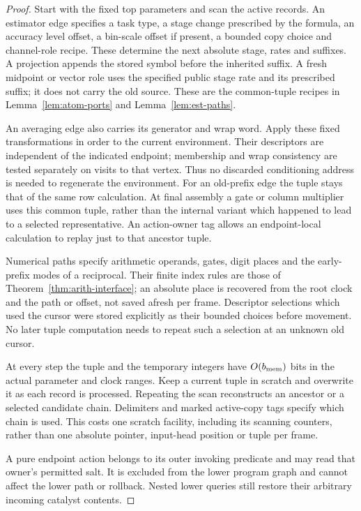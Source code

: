 \documentclass[11pt]{article}
\numberwithin{equation}{section}
\theoremstyle{definition}
\theoremstyle{remark}
\begin{document}
\begin{proof}
Start with the fixed top parameters and scan the active records.  An
estimator edge specifies a task type, a stage change prescribed by the
formula, an accuracy level offset, a bin-scale offset if present, a bounded copy
choice and channel-role recipe.  These determine the next absolute
stage, rates and suffixes.  A projection appends the stored symbol
before the inherited suffix.  A fresh midpoint or vector role uses the
specified public stage rate and its prescribed suffix; it does not
carry the old source.  These are the common-tuple recipes in
Lemma~\ref{lem:atom-ports} and Lemma~\ref{lem:est-paths}.

An averaging edge also carries its generator and wrap word.  Apply
these fixed transformations in order to the current environment.  Their
descriptors are independent of the indicated endpoint; membership and
wrap consistency are tested separately on visits to that vertex.
Thus no discarded conditioning address is needed to regenerate the
environment.  For an old-prefix edge the tuple stays that of the same
row calculation.  At final assembly a gate or column multiplier uses
this common tuple, rather than the internal variant which happened to
lead to a selected representative.  An action-owner tag allows an
endpoint-local calculation to replay just to that ancestor tuple.

Numerical paths specify arithmetic operands, gates, digit places and
the early-prefix modes of a reciprocal.  Their finite index rules are
those of Theorem~\ref{thm:arith-interface}; an absolute place is recovered
from the root clock and the path or offset, not saved afresh per frame.
Descriptor selections which used the cursor were stored explicitly as
their bounded choices before movement.  No later tuple computation
needs to repeat such a selection at an unknown old cursor.

At every step the tuple and the temporary integers have $O({b_{\rm mem}})$ bits in
the actual parameter and clock ranges.  Keep a current tuple in scratch
and overwrite it as each record is processed.  Repeating the scan
reconstructs an ancestor or a selected candidate chain.  Delimiters and
marked active-copy tags specify which chain is used.  This costs one
scratch facility, including its scanning counters, rather than one
absolute pointer, input-head position or tuple per frame.

A pure endpoint action belongs to its outer invoking predicate and may
read that owner's permitted salt.  It is excluded from the lower program
graph and cannot affect the lower path or rollback.  Nested lower queries
still restore their arbitrary incoming catalyst contents.


\end{proof}
\end{document}

